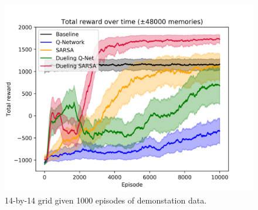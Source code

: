 \begin{figure}[h]
    \includegraphics[width=\linewidth]{img/results/14-sized/total_rewards_1000m-min.png}
    \caption{14-by-14 grid given 1000 episodes of demonstation data.}
    \label{fig:14sized-1000mem}
\end{figure}